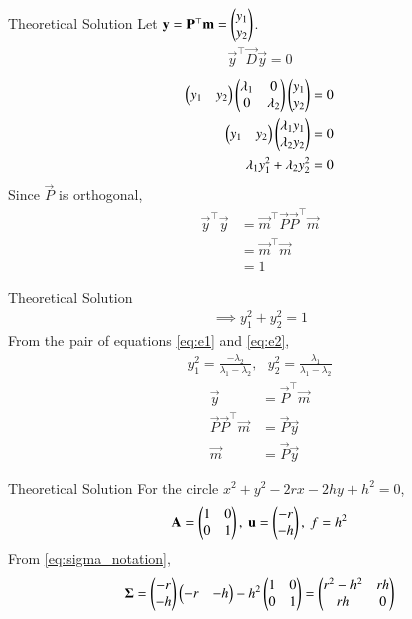 \documentclass{beamer}
\begin{document}
\begin{frame}{Theoretical Solution}
    Let $\mathbf{y} = \mathbf{P}^\top \mathbf{m} = \begin{pmatrix}y_1 \\ y_2\end{pmatrix} $.
\begin{align}
    \vec{y}^\top \vec{D} \vec{y} = 0
\end{align}
\begin{align}
    \begin{pmatrix}y_1 & y_2\end{pmatrix} \begin{pmatrix}\lambda_1 & 0 \\ 0 & \lambda_2\end{pmatrix} \begin{pmatrix}y_1 \\ y_2\end{pmatrix} &= 0 \\
    \begin{pmatrix}y_1 & y_2\end{pmatrix} \begin{pmatrix}\lambda_1 y_1 \\ \lambda_2 y_2\end{pmatrix} &= 0 \\
    \lambda_1 y_1^2 + \lambda_2 y_2^2 &= 0 \label{eq:e1}
\end{align}
Since $\vec{P}$ is orthogonal,
\begin{align}
    \vec{y}^\top\vec{y} &= \vec{m}^\top\vec{P}\vec{P}^\top\vec{m} \\
    &= \vec{m}^\top\vec{m} \\
    &= 1
\end{align}
\end{frame}

\begin{frame}{Theoretical Solution}
    \begin{align}
    \implies y_1^2 + y_2^2 = 1 \label{eq:e2}
\end{align}
From the pair of equations \eqref{eq:e1} and \eqref{eq:e2},
\begin{align}
    y_1^2 = \frac{-\lambda_2}{\lambda_1-\lambda_2},\text{ }y_2^2 = \frac{\lambda_1}{\lambda_1-\lambda_2}
\end{align}
\begin{align}
    \vec{y} &= \vec{P}^\top \vec{m} \\
    \vec{P}\vec{P}^\top\vec{m} &= \vec{P}\vec{y} \\
    \vec{m} &= \vec{P}\vec{y} \label{eq:equation}
\end{align}
\end{frame}

\begin{frame}{Theoretical Solution}
    For the circle $x^2+y^2-2rx-2hy+h^2=0$,
\begin{align}
    \mathbf{A} = \begin{pmatrix}1 & 0 \\ 0 & 1\end{pmatrix},\text{ }\mathbf{u} = \begin{pmatrix}-r \\ -h\end{pmatrix},\text{ }f = h^2
\end{align}
From \eqref{eq:sigma_notation},
\begin{align}
    \mathbf{\Sigma} = \begin{pmatrix}-r \\ -h\end{pmatrix}\begin{pmatrix}-r & -h\end{pmatrix} - h^2\begin{pmatrix}1 & 0 \\ 0 & 1\end{pmatrix} = \begin{pmatrix}r^2-h^2 & rh \\ rh & 0\end{pmatrix}
\end{align}
\end{frame}
\end{document}
